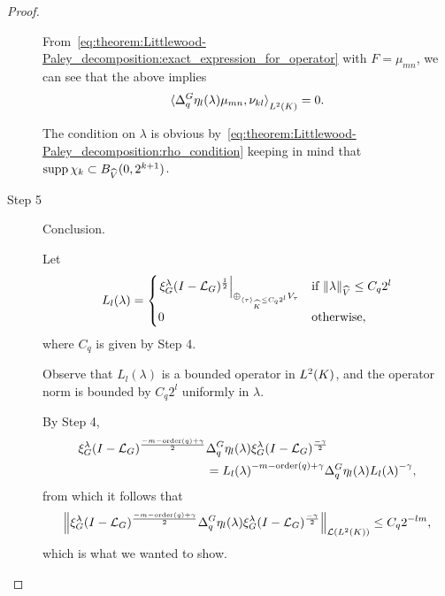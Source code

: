 \begin{proof}
\begin{description}
            From~\eqref{eq:theorem:Littlewood-Paley_decomposition:exact_expression_for_operator} with $F = \mu_{mn}$,
            we can see that the above implies
            \begin{align*}
                \ip[\Lebesgue{2}{\CompactGroup}]{\DifferenceOperator{q} \eta_l(\lambda) \mu_{mn}}{\nu_{kl}} = 0.
            \end{align*}

            The condition on $\lambda$ is obvious by~\eqref{eq:theorem:Littlewood-Paley_decomposition:rho_condition}
            keeping in mind that $\supp \chi_k \subset \Ball[\dualGroup{\VectorSpace}]{0}{2^{k + 1}}$.

        \item[Step 5] Conclusion.

            Let
            \begin{align*}
                L_l(\lambda) =
                \begin{cases}
                    {\left. \Rep{\lambda} \BesselPotential{1} \right|}_{\oplus_{\JapaneseBracket{\CompactGroup}{\tau} \leq C_q 2^l} V_\tau}
                    & \text{if } \norm[\dualGroup{\VectorSpace}]{\lambda} \leq C_q 2^l\\
                    0 & \text{otherwise},
                \end{cases}
            \end{align*}
            where $C_q$ is given by Step 4.

            Observe that $L_l(\lambda)$ is a bounded operator in $\Lebesgue{2}{\CompactGroup}$,
            and the operator norm is bounded by $C_q 2^l$ uniformly in $\lambda$.

            By Step 4,
            \begin{align*}
                \Rep{\lambda} \BesselPotential{- m - \order(q) + \gamma}&
                \DifferenceOperator{q} \eta_l(\lambda)
                \Rep{\lambda} \BesselPotential{-\gamma}\\
                &= {L_l(\lambda)}^{-m - \order(q) + \gamma}
                \DifferenceOperator{q} \eta_l(\lambda)
                {L_l(\lambda)}^{-\gamma},
            \end{align*}
            from which it follows that
            \begin{align*}
                \norm[\Lin{\Lebesgue{2}{\CompactGroup}}]{\Rep{\lambda} \BesselPotential{- m - \order(q) + \gamma} \DifferenceOperator{q} \eta_l(\lambda) \Rep{\lambda} \BesselPotential{-\gamma}}
                \leq C_q 2^{-l m},
            \end{align*}
            which is what we wanted to show.
    \end{description}
\end{proof}

